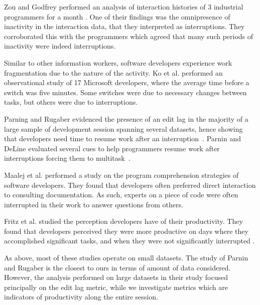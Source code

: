 \documentclass[times]{smrauth}
\begin{document}

Zou and Godfrey performed an analysis of interaction histories of 3 industrial programmers for a month \cite{ZG06}. One of their findings was the omnipresence of inactivity in the interaction data, that they interpreted as interruptions. They corroborated this with the programmers which agreed that many such periods of inactivity were indeed interruptions.

Similar to other information workers, software developers experience work fragmentation due to the nature of the activity. Ko et al. \cite{KDV07} performed an observational study of 17 Microsoft developers, where the average time before a switch was five minutes. Some switches were due to necessary changes between tasks, but others were
due to interruptions. 

Parning and Rugaber evidenced the presence of an edit lag in the majority of a large sample of development session spanning several datasets, hence showing that developers need time to resume work after an interruption~\cite{PR11}. Parnin and DeLine evaluated several cues  to help programmers resume work after interruptions forcing them to multitask~\cite{PD10}.

Maalej et al. \cite{MTRK14} performed a study on the program comprehension strategies of software developers. They found that developers often preferred direct interaction to consulting documentation. As such, experts on a piece of code were often interrupted in their work to answer questions from others.

Fritz et al. studied the perception developers have of their productivity. They found that developers perceived they were more productive on days where they accomplished significant tasks, and when they were not significantly interrupted \cite{MFMZ14}.

As above, most of these studies operate on small datasets. The study of Parnin and Rugaber is the closest to ours in terms of amount of data considered. However, the analysis performed on large datasets in their study focused principally on the edit lag metric, while we investigate metrics which are indicators of productivity along the entire session.
\end{document}
